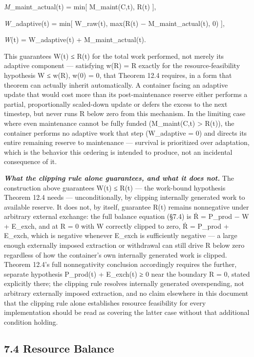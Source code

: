 \documentclass[
]{article}
\begin{document}
\emph{M}\_maint\_actual(t) = min{[} M\_maint(C,t), R(t) {]},

\emph{W}\_adaptive(t) = min{[} W\_raw(t), max(R(t) −
M\_maint\_actual(t), 0) {]},

\emph{W}(t) = W\_adaptive(t) + M\_maint\_actual(t).

This guarantees W(t) ≤ R(t) for the total work performed, not merely its
adaptive component --- satisfying w(R) = R exactly for the
resource-feasibility hypothesis W ≤ w(R), w(0) = 0, that Theorem 12.4
requires, in a form that theorem can actually inherit automatically. A
container facing an adaptive update that would cost more than its
post-maintenance reserve either performs a partial, proportionally
scaled-down update or defers the excess to the next timestep, but never
runs R below zero from this mechanism. In the limiting case where even
maintenance cannot be fully funded (M\_maint(C,t) \textgreater{} R(t)),
the container performs no adaptive work that step (W\_adaptive = 0) and
directs its entire remaining reserve to maintenance --- survival is
prioritized over adaptation, which is the behavior this ordering is
intended to produce, not an incidental consequence of it.

\emph{\textbf{What the clipping rule alone guarantees, and what it does
not.}} The construction above guarantees W(t) ≤ R(t) --- the work-bound
hypothesis Theorem 12.4 needs --- unconditionally, by clipping
internally generated work to available reserve. It does not, by itself,
guarantee R(t) remains nonnegative under arbitrary external exchange:
the full balance equation (§7.4) is Ṙ = P\_prod − W + E\_exch, and at R
= 0 with W correctly clipped to zero, Ṙ = P\_prod + E\_exch, which is
negative whenever E\_exch is sufficiently negative --- a large enough
externally imposed extraction or withdrawal can still drive R below zero
regardless of how the container's own internally generated work is
clipped. Theorem 12.4's full nonnegativity conclusion accordingly
requires the further, separate hypothesis P\_prod(t) + E\_exch(t) ≥ 0
near the boundary R = 0, stated explicitly there; the clipping rule
resolves internally generated overspending, not arbitrary externally
imposed extraction, and no claim elsewhere in this document that the
clipping rule alone establishes resource feasibility for every
implementation should be read as covering the latter case without that
additional condition holding.

\hypertarget{resource-balance}{%
\subsection{7.4 Resource Balance}\label{resource-balance}}
\end{document}
